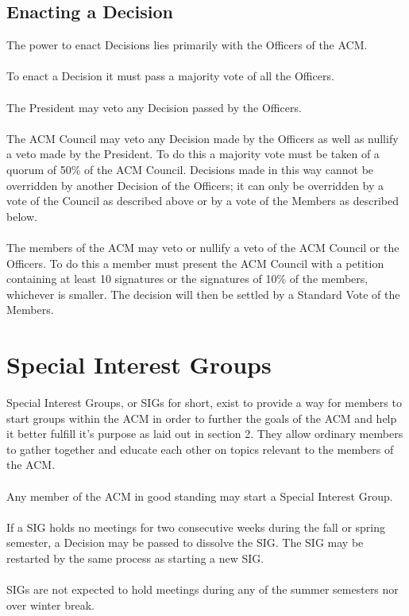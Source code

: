 \documentclass[12pt,titlepage]{article}
\begin{document}
\subsection{Enacting a Decision}

The power to enact Decisions lies primarily with the Officers of the ACM.\\
\\
To enact a Decision it must pass a majority vote of all the Officers.\\
\\
The President may veto any Decision passed by the Officers.\\
\\
The ACM Council may veto any Decision made by the Officers as well as nullify a veto made by the President. To do this a majority vote must be taken of a quorum of 50\% of the ACM Council. Decisions made in this way cannot be overridden by another Decision of the Officers; it can only be overridden by a vote of the Council as described above or by a vote of the Members as described below.\\
\\
The members of the ACM may veto or nullify a veto of the ACM Council or the Officers. To do this a member must present the ACM Council with a petition containing at least 10 signatures or the signatures of 10\% of the members, whichever is smaller. The decision will then be settled by a Standard Vote of the Members.

\section{Special Interest Groups}

Special Interest Groups, or SIGs for short, exist to provide a way for members to start groups within the ACM in order to further the goals of the ACM and help it better fulfill it's purpose as laid out in section 2. They allow ordinary members to gather together and educate each other on topics relevant to the members of the ACM.\\
\\
Any member of the ACM in good standing may start a Special Interest Group.\\
\\
If a SIG holds no meetings for two consecutive weeks during the fall or spring semester, a Decision may be passed to dissolve the SIG. The SIG may be restarted by the same process as starting a new SIG.\\
\\
SIGs are not expected to hold meetings during any of the summer semesters nor over winter break.
\end{document}
